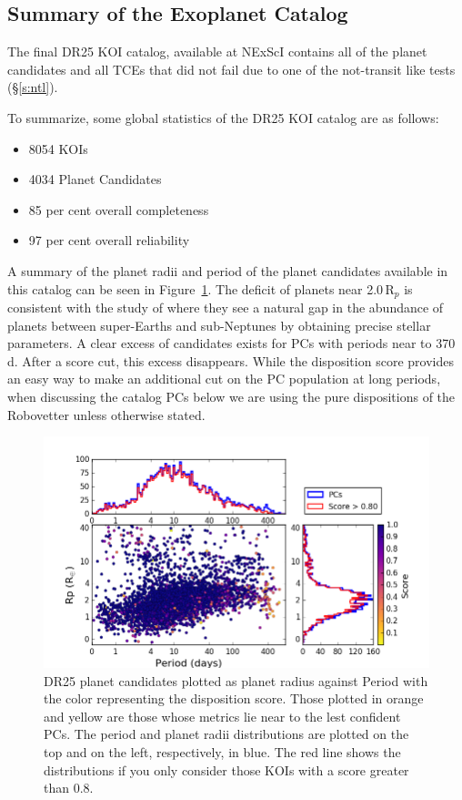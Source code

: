 \subsection{Summary of the Exoplanet Catalog}

The final DR25 KOI catalog, available at NExScI contains all of the planet candidates and all TCEs that did not fail due to one of the not-transit like tests (\S\ref{s:ntl}). 




To summarize, some global statistics of the DR25 KOI catalog are as follows:
\begin{itemize}
    \item 8054 KOIs
    \item 4034 Planet Candidates
    \item 85 per cent overall completeness
    \item 97 per cent overall reliability
\end{itemize}


A summary of the planet radii and period of the planet candidates available in this catalog can be seen in Figure~\ref{f:catalogPlot}. The deficit of planets near 2.0\,R$_{p}$ is consistent with the study of \citet{Fulton2017} where they see a natural gap in the abundance of planets between super-Earths and sub-Neptunes by obtaining precise stellar parameters. A clear excess of candidates exists for PCs with periods near to 370\,d.  After a score cut, this excess disappears. While the disposition score provides an easy way to make an additional cut on the PC population at long periods, when discussing the catalog PCs below we are using the pure dispositions of the Robovetter unless otherwise stated. 

\begin{figure}
    \centering
    \includegraphics[width=1.1\linewidth]{fig-radiusPeriodScore-hist.png}
    \caption{DR25 planet candidates plotted as planet radius against Period with the color representing the disposition score. Those plotted in orange and yellow are those whose metrics lie near to the lest confident PCs.  The period and planet radii distributions are plotted on the top and on the left, respectively, in blue. The red line shows the distributions if you only consider those KOIs with a score greater than 0.8. }
    \label{f:catalogPlot}
\end{figure}

